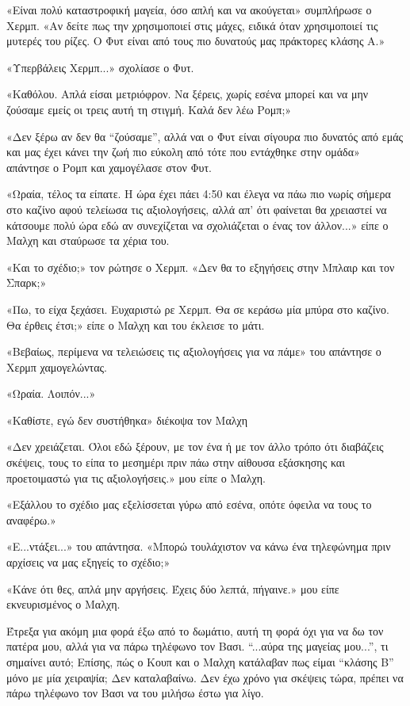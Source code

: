 \documentclass[12pt,twoside, openany]{book}
\begin{document}
«Είναι πολύ καταστροφική μαγεία, όσο απλή και να ακούγεται» συμπλήρωσε ο Χερμπ. «Αν δείτε πως την χρησιμοποιεί στις μάχες, ειδικά όταν χρησιμοποιεί τις μυτερές του ρίζες. Ο Φυτ είναι από τους πιο δυνατούς μας πράκτορες κλάσης Α.»

«Υπερβάλεις Χερμπ...» σχολίασε ο Φυτ.

«Καθόλου. Απλά είσαι μετριόφρον. Να ξέρεις, χωρίς εσένα μπορεί και να μην ζούσαμε εμείς οι τρεις αυτή τη στιγμή. Καλά δεν λέω Ρομπ;»

«Δεν ξέρω αν δεν θα “ζούσαμε”, αλλά ναι ο Φυτ είναι σίγουρα πιο δυνατός από εμάς και μας έχει κάνει την ζωή πιο εύκολη από τότε που εντάχθηκε στην ομάδα» απάντησε ο Ρομπ και χαμογέλασε στον Φυτ.

«Ωραία, τέλος τα είπατε. Η ώρα έχει πάει 4:50 και έλεγα να πάω πιο νωρίς σήμερα στο καζίνο αφού τελείωσα τις αξιολογήσεις, αλλά απ’ ότι φαίνεται θα χρειαστεί να κάτσουμε πολύ ώρα εδώ αν συνεχίζεται να σχολιάζεται ο ένας τον άλλον...» είπε ο Μαλχη και σταύρωσε τα χέρια του.

«Και το σχέδιο;» τον ρώτησε ο Χερμπ. «Δεν θα το εξηγήσεις στην Μπλαιρ και τον Σπαρκ;»

«Πω, το είχα ξεχάσει. Ευχαριστώ ρε Χερμπ. Θα σε κεράσω μία μπύρα στο καζίνο. Θα έρθεις έτσι;» είπε ο Μαλχη και του έκλεισε το μάτι.

«Βεβαίως, περίμενα να τελειώσεις τις αξιολογήσεις για να πάμε» του απάντησε ο Χερμπ χαμογελώντας.

«Ωραία. Λοιπόν...»

«Καθίστε, εγώ δεν συστήθηκα» διέκοψα τον Μαλχη

«Δεν χρειάζεται. Όλοι εδώ ξέρουν, με τον ένα ή με τον άλλο τρόπο ότι διαβάζεις σκέψεις, τους το είπα το μεσημέρι πριν πάω στην αίθουσα εξάσκησης και προετοιμαστώ για τις αξιολογήσεις.» μου είπε ο Μαλχη.

«Εξάλλου το σχέδιο μας εξελίσσεται γύρω από εσένα, οπότε όφειλα να τους το αναφέρω.»

«Ε...ντάξει...» του απάντησα. «Μπορώ τουλάχιστον να κάνω ένα τηλεφώνημα πριν αρχίσεις να μας εξηγείς το σχέδιο;»

«Κάνε ότι θες, απλά μην αργήσεις. Έχεις δύο λεπτά, πήγαινε.» μου είπε εκνευρισμένος ο Μαλχη.

Έτρεξα για ακόμη μια φορά έξω από το δωμάτιο, αυτή τη φορά όχι για να δω τον πατέρα μου, αλλά για να πάρω τηλέφωνο τον Βασι. “...αύρα της μαγείας μου...”, τι σημαίνει αυτό; Επίσης, πώς ο Κουπ και ο Μαλχη κατάλαβαν πως είμαι “κλάσης Β” μόνο με μία χειραψία; Δεν καταλαβαίνω. Δεν έχω χρόνο για σκέψεις τώρα, πρέπει να πάρω τηλέφωνο τον Βασι να του μιλήσω έστω για λίγο. 
\end{document}
